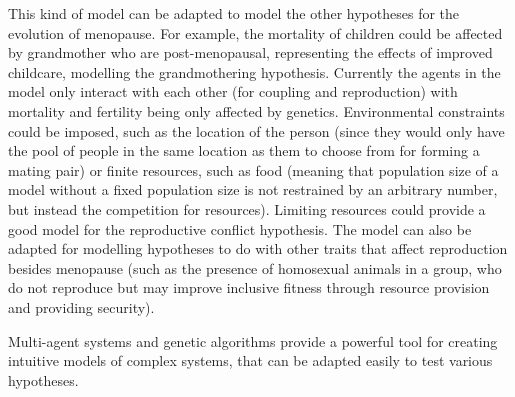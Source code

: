 \documentclass[authoryearcitations]{UoYCSproject}
\begin{document}
This kind of model can be adapted to model the other hypotheses for the evolution of menopause. For example, the mortality of children could be affected by grandmother who are post-menopausal, representing the effects of improved childcare, modelling the grandmothering hypothesis. Currently the agents in the model only interact with each other (for coupling and reproduction) with mortality and fertility being only affected by genetics. Environmental constraints could be imposed, such as the location of the person (since they would only have the pool of people in the same location as them to choose from for forming a mating pair) or finite resources, such as food (meaning that population size of a model without a fixed population size is not restrained by an arbitrary number, but instead the competition for resources). Limiting resources could provide a good model for the reproductive conflict hypothesis. The model can also be adapted for modelling hypotheses to do with other traits that affect reproduction besides menopause (such as the presence of homosexual animals in a group, who do not reproduce but may improve inclusive fitness through resource provision and providing security). 

Multi-agent systems and genetic algorithms provide a powerful tool for creating intuitive models of complex systems, that can be adapted easily to test various hypotheses.



 
\end{document}
